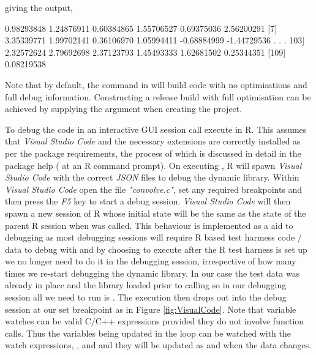 giving the output,

\begin{Schunk}
  \begin{Sinput}
  [1]  0.98293848  1.24876911  0.60384865  1.55706527  0.69375036  2.56200291
  [7]  3.35339771  1.99702141  0.36106970  1.05994411 -0.68884999 -1.44729536
   .
   .
   .
 103]  2.32572624  2.79692698  2.37123793  1.45493333  1.62681502  0.25344351
[109]  0.08219538
  \end{Sinput}
\end{Schunk}

Note that by default, the  command in  will build code with no optimisations and full debug information. 
Constructing a release build with full optimisation can be achieved by supplying the  argument when creating the project. 

To debug the code in an interactive GUI session call execute  in R. This assumes that
\emph{Visual Studio Code} and the necessary extensions are correctly installed as per the package requirements, the process of which is discussed in 
detail in the package help ( at an R command prompt). On executing , R will spawn \emph{Visual Studio Code} 
with the correct \emph{JSON} files to debug the dynamic library. Within \emph{Visual Studio Code} open the file \emph{"convolve.c"}, set any required
breakpoints and then press the \emph{F5} key to start a debug session. \emph{Visual Studio Code} will then spawn a new session of R whose initial state
will be the same as the state of the parent R session when  was called. This behaviour is implemented as a aid to debugging as most 
debugging sessions will require R based test harmess code / data to debug with and by choosing to execute  after the R test harness is 
set up we no longer need to do it in the debugging session, irrespective of how many times we re-start debugging the dynamic library. In our case 
the test data was already in place and the library loaded prior to calling  so in our debugging session all we need to run is . 
The execution then drops out into the debug session at our set breakpoint as in Figure \ref{fig:VisualCode}. Note that variable watches can be valid C/C++
expressions provided they do not involve function calls. Thus the variables being updated in the loop can be watched with the watch expressions, , 
 and  and they will be updated as and when the data changes. 

